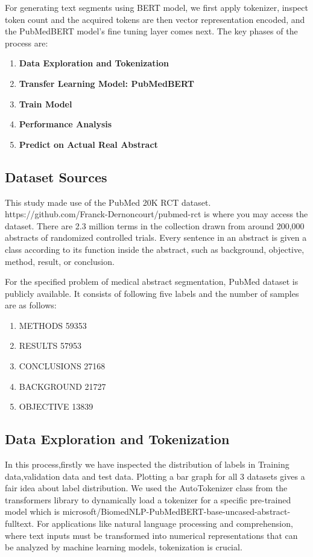 \documentclass[conference]{IEEEtran}
\begin{document}
For generating text segments using BERT model, we first apply tokenizer, inspect token count and the acquired tokens are then vector representation encoded, and the PubMedBERT model's fine tuning layer comes next. The key phases of the process are:
\begin{enumerate}
    \item \textbf{Data Exploration and Tokenization}
    \item \textbf{Transfer Learning Model: PubMedBERT}
    \item \textbf{Train Model}
    \item \textbf{Performance Analysis}
    \item \textbf{Predict on Actual Real Abstract}
\end{enumerate}


\subsection{Dataset Sources}

This study made use of the PubMed 20K RCT dataset. https://github.com/Franck-Dernoncourt/pubmed-rct is where you may access the dataset. There are 2.3 million terms in the collection drawn from around 200,000 abstracts of randomized controlled trials. Every sentence in an abstract is given a class according to its function inside the abstract, such as background, objective, method, result, or conclusion.

For the specified problem of medical abstract segmentation,
PubMed dataset is publicly available. It consists of following
five labels and the number of samples are as follows:

\begin{enumerate}
    \item METHODS 59353
    \item RESULTS 57953
    \item CONCLUSIONS 27168
    \item BACKGROUND 21727
    \item OBJECTIVE 13839
\end{enumerate}

\subsection{Data Exploration and Tokenization}

In this process,firstly we have inspected the distribution of labels in Training data,validation data and test data. Plotting a bar graph for all 3 datasets gives a fair idea about label distribution. We used the AutoTokenizer  class from the transformers library to dynamically load a tokenizer for a specific pre-trained model which is microsoft/BiomedNLP-PubMedBERT-base-uncased-abstract-fulltext. For applications like natural language processing and comprehension, where text inputs must be transformed into numerical representations that can be analyzed by machine learning models, tokenization is crucial.
\end{document}
